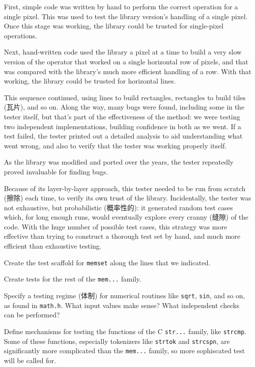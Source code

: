 First, simple code was written by hand to perform the correct operation for
a single pixel. This was used to test the library version's handling of a
single pixel. Once this stage was working, the library could be trusted for
single-pixel operations.

Next, hand-written code used the library a pixel at a time to build a very
slow version of the operator that worked on a single horizontal row of
pixels, and that was compared with the library's much more efficient
handling of a row. With that working, the library could be trusted for
horizontal lines.

This sequence continued, using lines to build rectangles, rectangles to
build tiles (瓦片), and so on. Along the way, many bugs were found,
including some in the tester itself, but that's part of the effectiveness
of the method: we were testing two independent implementations, building
confidence in both as we went. If a test failed, the tester printed out a
detailed analysis to aid understanding what went wrong, and also to verify
that the tester was working properly itself.

As the library was modified and ported over the years, the tester
repeatedly proved invaluable for finding bugs.

Because of its layer-by-layer approach, this tester needed to be run from
scratch (擦除) each time, to verify its own trust of the library.
Incidentally, the tester was not exhaustive, but probabilistic (概率性的):
it generated random test cases which, for long enough runs, would
eventually explore every cranny (缝隙) of the code. With the huge number of
possible test cases, this strategy was more effective than trying to
construct a thorough test set by hand, and much more efficient than
exhaustive testing.

\begin{exercise}
    Create the test scaffold for \verb'memset' along the lines that we
    indicated.
\end{exercise}

\begin{exercise}
    Create tests for the rest of the \verb'mem...' family.
\end{exercise}

\begin{exercise}
    Specify a testing regime (体制) for numerical routines like
    \verb'sqrt', \verb'sin', and so on, as found in \verb'math.h'. What
    input values make sense? What independent checks can be performed?
\end{exercise}

\begin{exercise}
    Define mechanisms for testing the functions of the C \verb'str...'
    family, like \verb'strcmp'. Some of these functions, especially
    tokenizers like \verb'strtok' and \verb'strcspn', are significantly
    more complicated than the \verb'mem...' family, so more sophiscated
    test will be called for.
\end{exercise}
